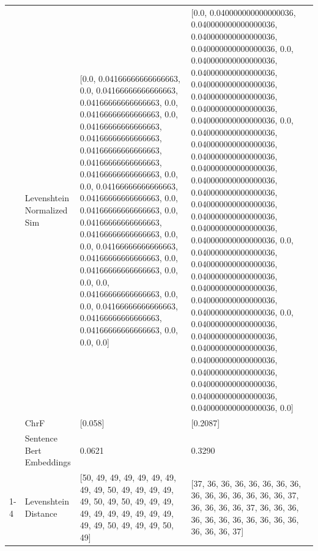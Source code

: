 \begin{tabular}{llll}
 & Levenshtein Normalized Sim & [0.0, 0.04166666666666663, 0.0, 0.04166666666666663, 0.04166666666666663, 0.0, 0.04166666666666663, 0.0, 0.04166666666666663, 0.04166666666666663, 0.04166666666666663, 0.04166666666666663, 0.04166666666666663, 0.0, 0.0, 0.04166666666666663, 0.04166666666666663, 0.0, 0.04166666666666663, 0.0, 0.04166666666666663, 0.04166666666666663, 0.0, 0.0, 0.04166666666666663, 0.04166666666666663, 0.0, 0.04166666666666663, 0.0, 0.0, 0.0, 0.04166666666666663, 0.0, 0.0, 0.04166666666666663, 0.04166666666666663, 0.04166666666666663, 0.0, 0.0, 0.0] & [0.0, 0.040000000000000036, 0.040000000000000036, 0.040000000000000036, 0.040000000000000036, 0.0, 0.040000000000000036, 0.040000000000000036, 0.040000000000000036, 0.040000000000000036, 0.040000000000000036, 0.040000000000000036, 0.0, 0.040000000000000036, 0.040000000000000036, 0.040000000000000036, 0.040000000000000036, 0.040000000000000036, 0.040000000000000036, 0.040000000000000036, 0.040000000000000036, 0.040000000000000036, 0.040000000000000036, 0.0, 0.040000000000000036, 0.040000000000000036, 0.040000000000000036, 0.040000000000000036, 0.040000000000000036, 0.040000000000000036, 0.0, 0.040000000000000036, 0.040000000000000036, 0.040000000000000036, 0.040000000000000036, 0.040000000000000036, 0.040000000000000036, 0.040000000000000036, 0.040000000000000036, 0.0] \\
 & ChrF & [0.058] & [0.2087] \\
 & Sentence Bert Embeddings & 0.0621 & 0.3290 \\
\cline{1-4}
\multirow[t]{4}{*}{Mburi na kaana itirumagwo} & Levenshtein Distance & [50, 49, 49, 49, 49, 49, 49, 49, 49, 50, 49, 49, 49, 49, 49, 50, 49, 50, 49, 49, 49, 49, 49, 49, 49, 49, 49, 49, 49, 49, 50, 49, 49, 49, 50, 49] & [37, 36, 36, 36, 36, 36, 36, 36, 36, 36, 36, 36, 36, 36, 36, 37, 36, 36, 36, 36, 37, 36, 36, 36, 36, 36, 36, 36, 36, 36, 36, 36, 36, 36, 36, 37] \\

\end{tabular}
